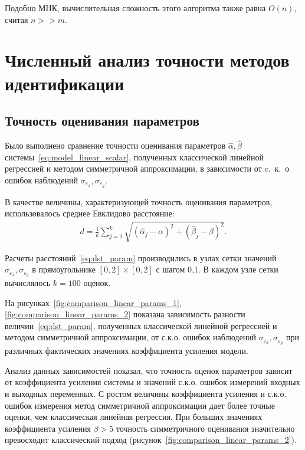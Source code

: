 Подобно МНК, вычислительная сложность этого алгоритма также равна \( O(n) \),
считая \( n >> m \).


\section{Численный анализ точности методов идентификации}

\subsection{Точность оценивания параметров}

Было выполнено сравнение точности оценивания параметров
\( \hat{\alpha}, \hat{\beta} \) системы~\eqref{eq:model_linear_scalar},
полученных классической линейной регрессией и методом симметричной аппроксимации,
в зависимости от c.~к.~о ошибок наблюдений \( \sigma_{\varepsilon_x}, \sigma_{\varepsilon_y} \).

В качестве величины, характеризующей точность оценивания параметров,
использовалось среднее Евклидово расстояние:
\begin{equation}
  \begin{aligned}
    d = \frac{1}{k} \sum_{j=1}^k \sqrt{(\hat{\alpha}_j - \alpha)^2 + (\hat{\beta}_j - \beta)^2}.
    \end{aligned}
  \label{eq:dst_param}
\end{equation}

Расчеты расстояний~\eqref{eq:dst_param} производились в узлах сетки значений
\( \sigma_{\varepsilon_x}, \sigma_{\varepsilon_y} \) в прямоугольнике
\( [0, 2] \times [0, 2] \) с шагом 0{,}1.
В каждом узле сетки вычислялось \( k = 100 \) оценок.

На рисунках~\ref{fig:comparison_linear_params_1}, \ref{fig:comparison_linear_params_2}
показана зависимость разности величин~\eqref{eq:dst_param},
полученных классической линейной регрессией и методом симметричной аппроксимации,
от с.к.о. ошибок наблюдений \( \sigma_{\varepsilon_x}, \sigma_{\varepsilon_y} \) при
различных фактических значениях коэффициента усиления модели.

Анализ данных зависимостей показал, что
точность оценок параметров зависит от коэффициента усиления системы и
значений с.к.о. ошибок измерений входных и выходных переменных.
С ростом величины коэффициента усиления и с.к.о. ошибок измерения
метод симметричной аппроксимации дает более точные оценки,
чем классическая линейная регрессия.
При больших значениях коэффициента усиления \( \beta > 5 \)
точность симметричного оценивания значительно превосходит
классический подход (рисунок~\ref{fig:comparison_linear_params_2}).

